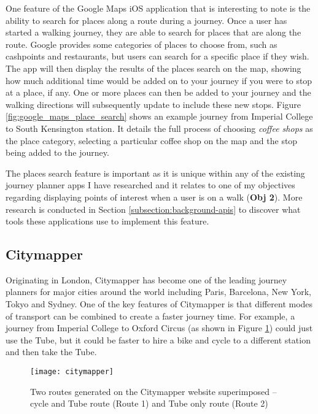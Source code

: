 One feature of the Google Maps iOS application that is interesting to note is the ability to search for places along a route during a journey. Once a user has started a walking journey, they are able to search for places that are along the route. Google provides some categories of places to choose from, such as cashpoints and restaurants, but users can search for a specific place if they wish. The app will then display the results of the places search on the map, showing how much additional time would be added on to your journey if you were to stop at a place, if any. One or more places can then be added to your journey and the walking directions will subsequently update to include these new stops. Figure \ref{fig:google_maps_place_search} shows an example journey from Imperial College to South Kensington station. It details the full process of choosing \textit{coffee shops} as the place category, selecting a particular coffee shop on the map and the stop being added to the journey.

The places search feature is important as it is unique within any of the existing journey planner apps I have researched and it relates to one of my objectives regarding displaying points of interest when a user is on a walk (\textbf{Obj 2}). More research is conducted in Section \ref{subsection:background-apis} to discover what tools these applications use to implement this feature.

\subsection{Citymapper}

Originating in London, Citymapper \cite{Citymapper} has become one of the leading journey planners for major cities around the world including Paris, Barcelona, New York, Tokyo and Sydney. One of the key features of Citymapper is that different modes of transport can be combined to create a faster journey time. For example, a journey from Imperial College to Oxford Circus (as shown in Figure \ref{fig:citymapper}) could just use the Tube, but it could be faster to hire a bike and cycle to a different station and then take the Tube.

\begin{figure}[hbt]
  \centering
  \texttt{[image: citymapper]}
  \caption{Two routes generated on the Citymapper website superimposed -- cycle and Tube route (Route 1) and Tube only route (Route 2)}
  \label{fig:citymapper}
\end{figure}

